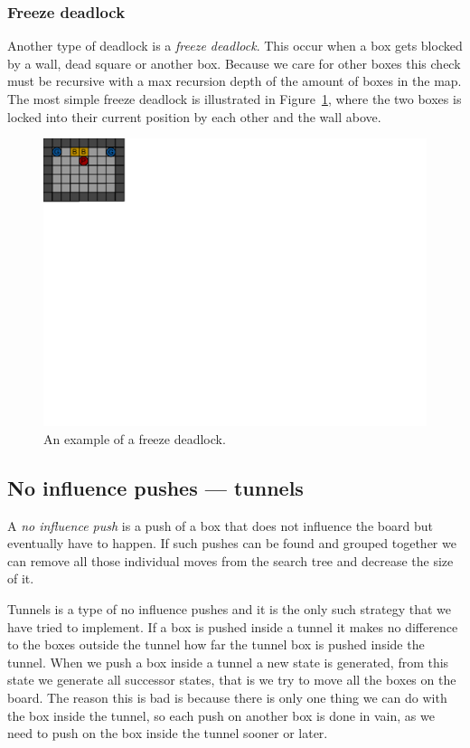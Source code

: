 \documentclass[a4paper,11pt]{article}
\renewcommand{\*}[0]{\cdot}
\begin{document}
\subsubsection{Freeze deadlock}

Another type of deadlock is a \emph{freeze deadlock}. This occur when a box gets
blocked by a wall, dead square or another box. Because we care for other boxes
this check must be recursive with a max recursion depth of the amount of boxes
in the map. The most simple freeze deadlock is illustrated in
Figure~\ref{fig:freezeDeadlock}, where the two boxes is locked into their
current position by each other and the wall above.

\begin{figure}[h!]
    \begin{center}
        \includegraphics{figures/freezeDeadlock}
    \end{center}
    \caption{An example of a freeze deadlock.}
    \label{fig:freezeDeadlock}
\end{figure}


\subsection{No influence pushes --- tunnels}

A \emph{no influence push} is a push of a box that does not influence the board
but eventually have to happen. If such pushes can be found and grouped together
we can remove all those individual moves from the search tree and decrease the
size of it.

Tunnels is a type of no influence pushes and it is the only such strategy that
we have tried to implement. If a box is pushed inside a tunnel it makes no
difference to the boxes outside the tunnel how far the tunnel box is pushed
inside the tunnel. When we push a box inside a tunnel a new state is generated,
from this state we generate all successor states, that is we try to move all
the boxes on the board. The reason this is bad is because there is only one
thing we can do with the box inside the tunnel, so each push on another box is
done in vain, as we need to push on the box inside the tunnel sooner or  later.
\end{document}
